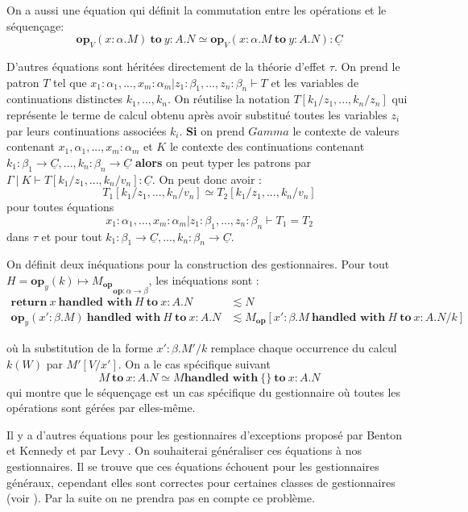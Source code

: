 On a aussi une équation qui définit la commutation entre les opérations et le séquençage:
	\[\textbf{op}_V(x:\alpha.M)~\textbf{to}~y:A.N \simeq \textbf{op}_V(x:\alpha.M~\textbf{to}~y:A.N):\underline{C}\]
\medbreak

D'autres équations sont héritées directement de la théorie d'effet $\tau$. On prend le patron $T$ tel que $x_1:\alpha_1,...,x_m:\alpha_m|z_1:\beta_1,...,z_n:\beta_n \vdash T$ et les variables de continuations distinctes $k_1,...,k_n$. On réutilise la notation $T[k_1/z_1,...,k_n/z_n]$  qui représente le terme de calcul obtenu après avoir substitué toutes les variables $z_i$ par leurs continuations associées $k_i$. 
\medbreak
\textbf{Si} on prend $Gamma$ le contexte de valeurs contenant $x_1,\alpha_1,...,x_m:\alpha_m$ et $K$ le contexte des continuations contenant $k_1:\beta_1 \rightarrow \underline{C},...,k_n:\beta_n \rightarrow \underline{C}$ \textbf{alors} on peut typer les patrons par $\Gamma~|~K \vdash T[k_1/z_1,...,k_n/v_n]:\underline{C}$. On peut donc avoir :
\[T_1[k_1/z_1,...,k_n/v_n] \simeq T_2[k_1/z_1,...,k_n/v_n]\]
pour toutes équations 
\[x_1:\alpha_1,...,x_m:\alpha_m|z_1:\beta_1,...,z_n:\beta_n \vdash T_1 = T_2\]
dans $\tau$ et pour tout $k_1:\beta_1 \rightarrow \underline{C},...,k_n:\beta_n \rightarrow \underline{C}$.
\newpage

On définit deux inéquations pour la construction des gestionnaires. 
Pour tout $H = {\textbf{op}_y(k) \mapsto M_\textbf{op}}_{\textbf{op}:\alpha \rightarrow \beta}$, les inéquations sont : 
\begin{align*}
	\textbf{return}~x~\textbf{handled~with}~H~\textbf{to}~x:A.N  &\lesssim N\\
	\textbf{op}_y(x':\beta.M)~\textbf{handled~with}~H~\textbf{to}~x:A.N&\lesssim M_\textbf{op}[x':\beta.M~\textbf{handled~with}~H~\textbf{to}~x:A.N/k]
\end{align*}
	
où la substitution de la forme $x':\beta.M'/k$ remplace chaque occurrence du calcul $k(W)$ par $M'[V/x']$. On a le cas spécifique suivant
	\[M~\textbf{to}~x:A.N \simeq M \textbf{handled~with}~\{\}~\textbf{to}~x:A.N\]
qui montre que le séquençage est un cas spécifique du gestionnaire où toutes les opérations sont gérées par elles-même.


Il y a d'autres équations pour les gestionnaires d'exceptions proposé par Benton et Kennedy \cite{DBLP:journals/jfp/BentonK01} et par Levy \cite{DBLP:journals/entcs/Levy06a}. On souhaiterai généraliser ces équations à nos gestionnaires. Il se trouve que ces équations échouent pour les gestionnaires généraux, cependant elles sont correctes pour certaines classes de gestionnaires (voir \cite{DBLP:conf/lics/PlotkinP08}). Par la suite on ne prendra pas en compte ce problème.
\smallbreak

